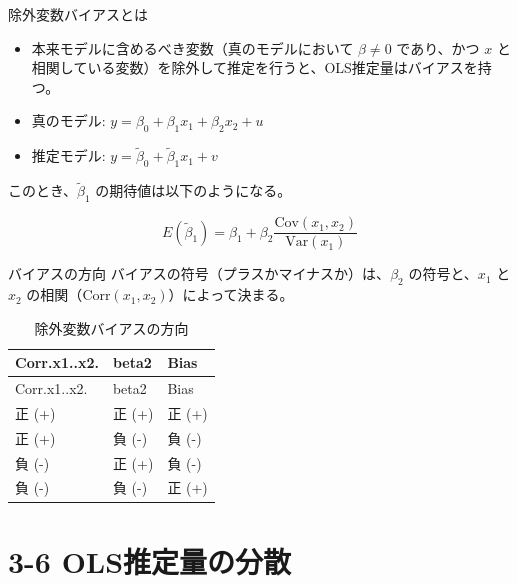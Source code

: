 \documentclass[
  ignorenonframetext,
]{beamer}
\begin{document}
\begin{frame}{除外変数バイアスとは}
\protect\hypertarget{ux9664ux5916ux5909ux6570ux30d0ux30a4ux30a2ux30b9ux3068ux306f}{}
\begin{itemize}
\item
  本来モデルに含めるべき変数（真のモデルにおいて \(\beta \neq 0\)
  であり、かつ \(x\)
  と相関している変数）を除外して推定を行うと、OLS推定量はバイアスを持つ。
\item
  真のモデル: \(y = \beta_0 + \beta_1 x_1 + \beta_2 x_2 + u\)
\item
  推定モデル: \(y = \tilde{\beta}_0 + \tilde{\beta}_1 x_1 + v\)
\end{itemize}

このとき、\(\tilde{\beta}_1\) の期待値は以下のようになる。

\[ E(\tilde{\beta}_1) = \beta_1 + \beta_2 \frac{\text{Cov}(x_1, x_2)}{\text{Var}(x_1)} \]
\end{frame}

\begin{frame}{バイアスの方向}
\protect\hypertarget{ux30d0ux30a4ux30a2ux30b9ux306eux65b9ux5411}{}
バイアスの符号（プラスかマイナスか）は、\(\beta_2\) の符号と、\(x_1\) と
\(x_2\) の相関（\(\text{Corr}(x_1, x_2)\)）によって決まる。

\begin{longtable}[]{@{}lll@{}}
\caption{除外変数バイアスの方向}\tabularnewline
\toprule
Corr.x1..x2. & beta2 & Bias \\
\midrule
\endfirsthead
\toprule
Corr.x1..x2. & beta2 & Bias \\
\midrule
\endhead
正 (+) & 正 (+) & 正 (+) \\
正 (+) & 負 (-) & 負 (-) \\
負 (-) & 正 (+) & 負 (-) \\
負 (-) & 負 (-) & 正 (+) \\
\bottomrule
\end{longtable}
\end{frame}

\hypertarget{olsux63a8ux5b9aux91cfux306eux5206ux6563}{%
\section{3-6
OLS推定量の分散}\label{olsux63a8ux5b9aux91cfux306eux5206ux6563}}
\end{document}
